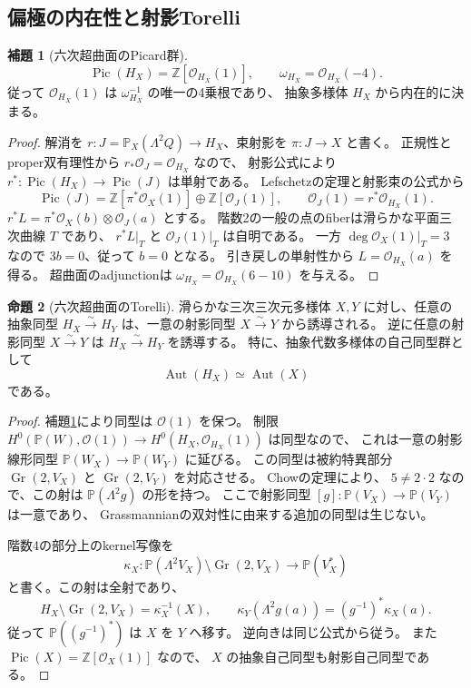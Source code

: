 \documentclass[a4paper,11pt]{ltjsarticle}
\theoremstyle{definition}
\newtheorem{theorem}{命題}[section]
\newtheorem{lemma}[theorem]{補題}
\newcommand{\OO}{\mathcal O}
\newcommand{\PP}{\mathbb P}
\newcommand{\Gr}{\operatorname{Gr}}
\begin{document}
\subsection{偏極の内在性と射影Torelli}

\begin{lemma}[六次超曲面のPicard群]\label{lem:sextic-picard}
\[
 \operatorname{Pic}(H_X)=\mathbb Z[\OO_{H_X}(1)],\qquad
 \omega_{H_X}=\OO_{H_X}(-4).
\]
従って $\OO_{H_X}(1)$ は $\omega_{H_X}^{-1}$ の唯一の4乗根であり、
抽象多様体 $H_X$ から内在的に決まる。
\end{lemma}

\begin{proof}
解消を $r:J=\PP_X(\Lambda^2Q)\to H_X$、束射影を $\pi:J\to X$ と書く。
正規性とproper双有理性から $r_*\OO_J=\OO_{H_X}$ なので、
射影公式により $r^*:\operatorname{Pic}(H_X)\to\operatorname{Pic}(J)$ は単射である。
Lefschetzの定理\cite[Expos\'e XII, Corollaire 3.7]{SGA2}と射影束の公式から
\[
 \operatorname{Pic}(J)
 =\mathbb Z[\pi^*\OO_X(1)]\oplus\mathbb Z[\OO_J(1)],\qquad
 \OO_J(1)=r^*\OO_{H_X}(1).
\]
$r^*L=\pi^*\OO_X(b)\otimes\OO_J(a)$ とする。
階数2の一般の点のfiberは滑らかな平面三次曲線 $T$ であり、
$r^*L|_T$ と $\OO_J(1)|_T$ は自明である。
一方 $\deg\OO_X(1)|_T=3$ なので $3b=0$、従って $b=0$ となる。
引き戻しの単射性から $L=\OO_{H_X}(a)$ を得る。
超曲面のadjunctionは $\omega_{H_X}=\OO_{H_X}(6-10)$ を与える。
\end{proof}

\begin{theorem}[六次超曲面のTorelli]\label{thm:sextic-torelli}
滑らかな三次三次元多様体 $X,Y$ に対し、任意の抽象同型
$H_X\xrightarrow{\sim}H_Y$ は、一意の射影同型 $X\xrightarrow{\sim}Y$ から誘導される。
逆に任意の射影同型 $X\xrightarrow{\sim}Y$ は $H_X\xrightarrow{\sim}H_Y$ を誘導する。
特に、抽象代数多様体の自己同型群として
\[
                       \operatorname{Aut}(H_X)\simeq\operatorname{Aut}(X)
\]
である。
\end{theorem}

\begin{proof}
補題\ref{lem:sextic-picard}により同型は $\OO(1)$ を保つ。
制限 $H^0(\PP(W),\OO(1))\to H^0(H_X,\OO_{H_X}(1))$ は同型なので、
これは一意の射影線形同型 $\PP(W_X)\to\PP(W_Y)$ に延びる。
この同型は被約特異部分 $\Gr(2,V_X)$ と $\Gr(2,V_Y)$ を対応させる。
Chowの定理\cite[Section II.1]{ChowGrass}\cite[Theorem 3.6]{GhorpadeKaipa}により、
$5\ne2\cdot2$ なので、この射は $\PP(\Lambda^2g)$ の形を持つ。
ここで射影同型 $[g]:\PP(V_X)\to\PP(V_Y)$ は一意であり、
Grassmannianの双対性に由来する追加の同型は生じない。

階数4の部分上のkernel写像を
\[
 \kappa_X:\PP(\Lambda^2V_X)\setminus\Gr(2,V_X)\longrightarrow\PP(V_X^*)
\]
と書く。この射は全射であり、
\[
 H_X\setminus\Gr(2,V_X)=\kappa_X^{-1}(X),\qquad
 \kappa_Y(\Lambda^2g(a))=(g^{-1})^*\kappa_X(a).
\]
従って $\PP((g^{-1})^*)$ は $X$ を $Y$ へ移す。
逆向きは同じ公式から従う。
また $\operatorname{Pic}(X)=\mathbb Z[\OO_X(1)]$ なので、
$X$ の抽象自己同型も射影自己同型である。
\end{proof}
\end{document}
